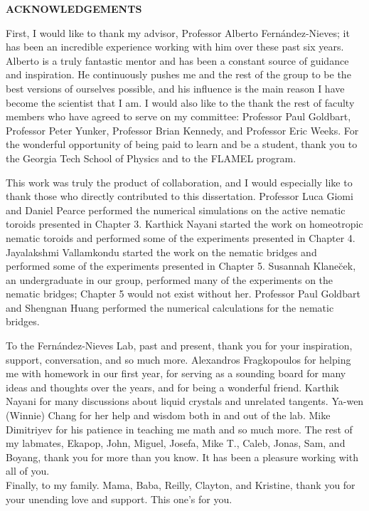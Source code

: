 \clearpage
\begin{centering}
\textbf{ACKNOWLEDGEMENTS}\\
\vspace{\baselineskip}
\end{centering}

First, I would like to thank my advisor, Professor Alberto Fern\'andez-Nieves; it has been an incredible experience working with him over these past six years.
Alberto is a truly fantastic mentor and has been a constant source of guidance and inspiration.
He continuously pushes me and the rest of the group to be the best versions of ourselves possible, and his influence is the main reason I have become the scientist that I am.
I would also like to the thank the rest of faculty members who have agreed to serve on my committee: Professor Paul Goldbart, Professor Peter Yunker, Professor Brian Kennedy, and Professor Eric Weeks.
For the wonderful opportunity of being paid to learn and be a student, thank you to the Georgia Tech School of Physics and to the FLAMEL program.

This work was truly the product of collaboration, and I would especially like to thank those who directly contributed to this dissertation.
Professor Luca Giomi and Daniel Pearce performed the numerical simulations on the active nematic toroids presented in Chapter 3.
Karthick Nayani started the work on homeotropic nematic toroids and performed some of the experiments presented in Chapter 4.
Jayalakshmi Vallamkondu started the work on the nematic bridges and performed some of the experiments presented in Chapter 5.
Susannah Klane\u{c}ek, an undergraduate in our group, performed many of the experiments on the nematic bridges; Chapter 5 would not exist without her.
Professor Paul Goldbart and Shengnan Huang performed the numerical calculations for the nematic bridges.

To the Fern\'andez-Nieves Lab, past and present, thank you for your inspiration, support, conversation, and so much more.
Alexandros Fragkopoulos for helping me with homework in our first year, for serving as a sounding board for many ideas and thoughts over the years, and for being a wonderful friend.
Karthik Nayani for many discussions about liquid crystals and unrelated tangents.
Ya-wen (Winnie) Chang for her help and wisdom both in and out of the lab.
Mike Dimitriyev for his patience in teaching me math and so much more.
The rest of my labmates, Ekapop, John, Miguel, Josefa, Mike T., Caleb, Jonas, Sam, and Boyang, thank you for more than you know.
It has been a pleasure working with all of you. \\

\noindent Finally, to my family.
Mama, Baba, Reilly, Clayton, and Kristine, thank you for your unending love and support.
This one's for you.

\clearpage
